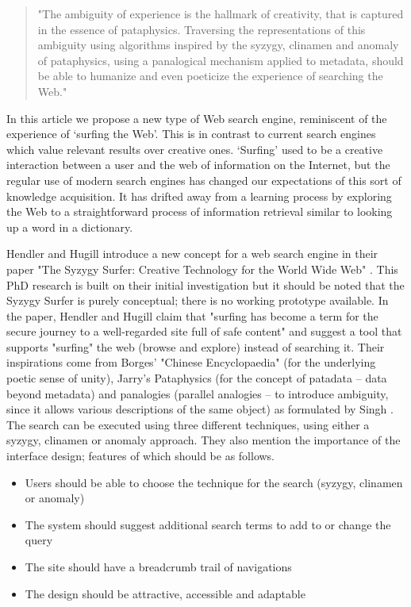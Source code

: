 \begin{quote}
  "The ambiguity of experience is the hallmark of creativity, that is captured in the essence of pataphysics. Traversing the representations of this ambiguity using algorithms inspired by the syzygy, clinamen and anomaly of pataphysics, using a panalogical mechanism applied to metadata, should be able to humanize and even poeticize the experience of searching the Web." \citep{Hendler2013}
\end{quote}

In this article we propose a new type of Web search engine, reminiscent of the experience of ‘surfing the Web'. This is in contrast to current search engines which value relevant results over creative ones. ‘Surfing' used to be a creative interaction between a user and the web of information on the Internet, but the regular use of modern search engines has changed our expectations of this sort of knowledge acquisition. It has drifted away from a learning process by exploring the Web to a straightforward process of information retrieval similar to looking up a word in a dictionary.

Hendler and Hugill introduce a new concept for a web search engine in their paper "The Syzygy Surfer: Creative Technology for the World Wide Web" \citep{Hendler2011}. This PhD research is built on their initial investigation but it should be noted that the Syzygy Surfer is purely conceptual; there is no working prototype available. In the paper, Hendler and Hugill claim that "surfing has become a term for the secure journey to a well-regarded site full of safe content" and suggest a tool that supports "surfing" the web (browse and explore) instead of searching it. Their inspirations come from Borges' "Chinese Encyclopaedia" \citep{Borges2000} (for the underlying poetic sense of unity), Jarry's Pataphysics (for the concept of patadata – data beyond metadata) and  panalogies (parallel analogies – to introduce ambiguity, since it allows various descriptions of the same object) as formulated by Singh \citep{Singh2005}. The search can be executed using three different techniques, using either a syzygy, clinamen or anomaly approach. They also mention the importance of the interface design; features of which should be as follows.

\begin{itemize}
  \item Users should be able to choose the technique for the search (syzygy, clinamen or anomaly)
  \item The system should suggest additional search terms to add to or change the query
  \item The site should have a breadcrumb trail of navigations
  \item The design should be attractive, accessible and adaptable
\end{itemize}

